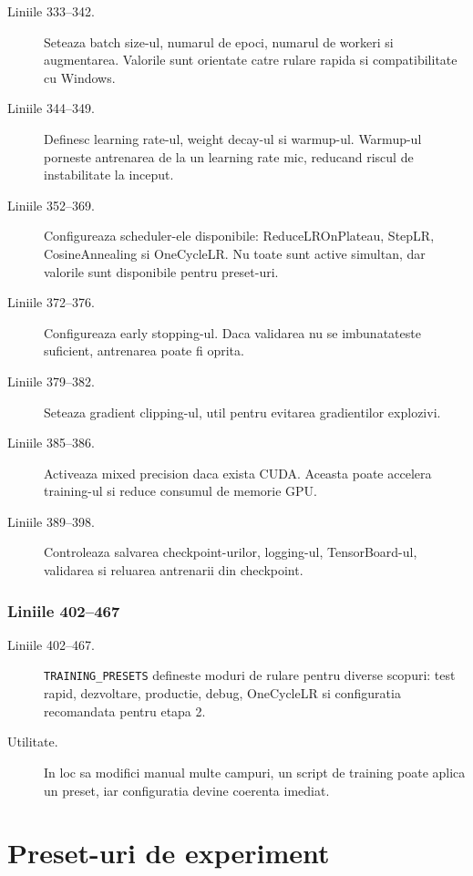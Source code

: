 \documentclass[12pt,a4paper]{report}
\newcommand{\codechunk}[2]{%
\subsection*{Liniile #1--#2}

}
\begin{document}
\begin{description}
    \item[Liniile 333--342.] Seteaza batch size-ul, numarul de epoci, numarul de
    workeri si augmentarea. Valorile sunt orientate catre rulare rapida si
    compatibilitate cu Windows.

    \item[Liniile 344--349.] Definesc learning rate-ul, weight decay-ul si warmup-ul.
    Warmup-ul porneste antrenarea de la un learning rate mic, reducand riscul de
    instabilitate la inceput.

    \item[Liniile 352--369.] Configureaza scheduler-ele disponibile: ReduceLROnPlateau,
    StepLR, CosineAnnealing si OneCycleLR. Nu toate sunt active simultan, dar
    valorile sunt disponibile pentru preset-uri.

    \item[Liniile 372--376.] Configureaza early stopping-ul. Daca validarea nu se
    imbunatateste suficient, antrenarea poate fi oprita.

    \item[Liniile 379--382.] Seteaza gradient clipping-ul, util pentru evitarea
    gradientilor explozivi.

    \item[Liniile 385--386.] Activeaza mixed precision daca exista CUDA. Aceasta
    poate accelera training-ul si reduce consumul de memorie GPU.

    \item[Liniile 389--398.] Controleaza salvarea checkpoint-urilor, logging-ul,
    TensorBoard-ul, validarea si reluarea antrenarii din checkpoint.
\end{description}

\codechunk{402}{467}

\begin{description}
    \item[Liniile 402--467.] \texttt{TRAINING\_PRESETS} defineste moduri de rulare
    pentru diverse scopuri: test rapid, dezvoltare, productie, debug, OneCycleLR
    si configuratia recomandata pentru etapa 2.

    \item[Utilitate.] In loc sa modifici manual multe campuri, un script de training
    poate aplica un preset, iar configuratia devine coerenta imediat.
\end{description}

\chapter{Preset-uri de experiment}
\end{document}
